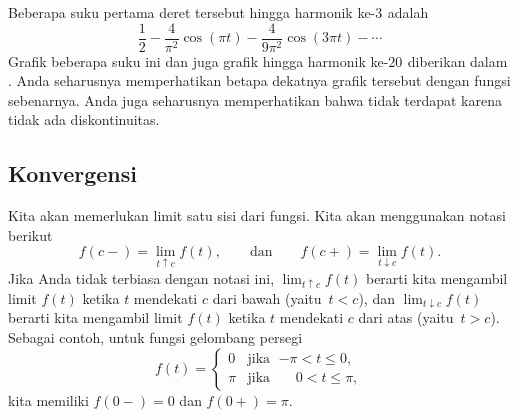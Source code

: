 \begin{example}
Beberapa suku pertama deret tersebut
hingga harmonik ke-$3^{\text{}}$ adalah
\begin{equation*}
\frac{1}{2} -
\frac{4}{\pi^2} \cos (\pi t)
-
\frac{4}{9 \pi^2} \cos (3 \pi t)
- \cdots
\end{equation*}
Grafik beberapa suku ini dan juga grafik hingga harmonik
ke-${20}^{\text{}}$ diberikan dalam
.  Anda seharusnya memperhatikan betapa dekatnya grafik tersebut
dengan fungsi sebenarnya.  Anda juga seharusnya memperhatikan bahwa tidak terdapat
 karena tidak ada diskontinuitas.

\begin{myfig}
\capstart
\caption{Deret Fourier dari $f(t)$ hingga harmonik ke-$3^{\text{}}$ (grafik
kiri)
dan hingga harmonik ke-${20}^{\text{}}$ (grafik kanan).\label{gfs:sawcontfsfig}}
\end{myfig}
\end{example}

\subsection{Konvergensi}

Kita akan memerlukan limit satu sisi dari fungsi.
Kita akan menggunakan notasi berikut
\begin{equation*}
f(c-) = \lim_{t \uparrow c} f(t),
\qquad \text{dan} \qquad
f(c+) = \lim_{t \downarrow c} f(t).
\end{equation*}
Jika Anda tidak terbiasa dengan notasi ini,
$\lim_{t \uparrow c} f(t)$ berarti kita mengambil limit $f(t)$
ketika $t$ mendekati $c$ dari bawah (yaitu\ $t < c$), dan
$\lim_{t \downarrow c} f(t)$ berarti kita mengambil limit $f(t)$
ketika $t$ mendekati $c$ dari atas (yaitu\ $t > c$).
Sebagai contoh, untuk fungsi gelombang persegi
\begin{equation} \label{gfs:sqwaveeq}
f(t) =
\begin{cases}
0 & \text{jika } \; {-\pi} < t \leq 0 , \\
\pi & \text{jika } \; \phantom{-}0 < t \leq \pi ,
\end{cases}
\end{equation}
kita memiliki $f(0-) = 0$ dan $f(0+) = \pi$.

